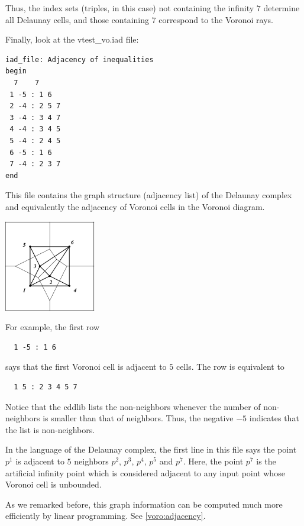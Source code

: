 \documentclass[[a4paper,12pt]{article}
\newcommand{\HBrule}{\noindent \hrulefill \medskip}
\newcommand{\HTrule}{\medskip \noindent \hrulefill}
\begin{document}
\begin{small}
Thus, the index sets (triples, in this case) not containing
the infinity $7$ determine all Delaunay cells, and those
containing $7$ correspond to the Voronoi rays.

Finally, look at the vtest\_vo.iad file:
 
 
\HTrule
\begin{verbatim}
iad_file: Adjacency of inequalities
begin
  7    7
 1 -5 : 1 6 
 2 -4 : 2 5 7 
 3 -4 : 3 4 7 
 4 -4 : 3 4 5 
 5 -4 : 2 4 5 
 6 -5 : 1 6 
 7 -4 : 2 3 7 
end
\end{verbatim}
\HBrule

\noindent
This file contains the graph structure (adjacency list) of the Delaunay complex
and equivalently the adjacency of Voronoi cells in the Voronoi
diagram.

\bigskip
\begin{center}
\includegraphics[height=40mm]{vtest_draw_vode}
\end{center}

\noindent
For example, the first row
\begin{verbatim}
  1 -5 : 1 6 
\end{verbatim}
says that the first Voronoi cell is adjacent to $5$ cells.
The row is equivalent to
\begin{verbatim}
  1 5 : 2 3 4 5 7
\end{verbatim}
Notice that the cddlib lists the non-neighbors whenever
the number of non-neighbors is smaller than that of neighbors.  
Thus, the negative
$-5$ indicates that the list is non-neighbors.

In the language of the Delaunay complex, the first line in this file
says the point $p^1$ is adjacent to $5$ neighbors
$p^2$, $p^3$, $p^4$, $p^5$ and $p^7$.  Here,
the point $p^7$ is the artificial infinity point
which is considered adjacent to any input point
whose Voronoi cell is unbounded.

As we remarked before, this graph information can be
computed much more efficiently by linear programming.
See \ref{voro:adjacency}.
\end{small}
\end{document}

